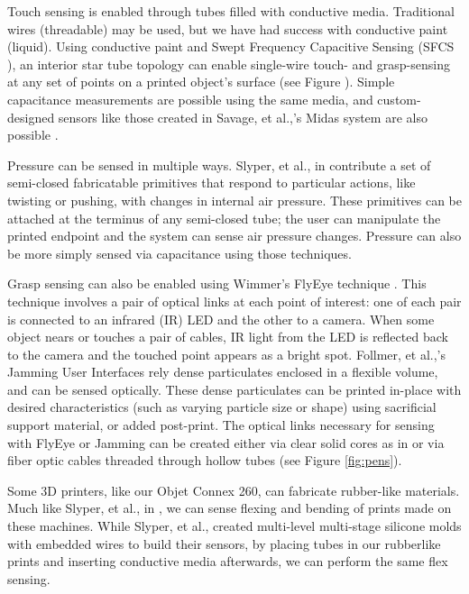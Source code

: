Touch sensing is enabled through tubes filled with conductive media.  Traditional wires (threadable) may be used, but we have had success with conductive paint (liquid).  Using conductive paint and Swept Frequency Capacitive Sensing (SFCS \cite{Sato-touche}), an interior star tube topology can enable single-wire touch- and grasp-sensing at any set of points on a printed object's surface (see Figure \cite{fig:toy}).  Simple capacitance measurements are possible using the same media, and custom-designed sensors like those created in Savage, et al.,'s Midas system are also possible \cite{Savage-midas}.

Pressure can be sensed in multiple ways.  Slyper, et al., in \cite{Slyper-pressure} contribute a set of semi-closed fabricatable primitives that respond to particular actions, like twisting or pushing, with changes in internal air pressure.    These primitives can be attached at the terminus of any semi-closed tube; the user can manipulate the printed endpoint and the system can sense air pressure changes.  Pressure can also be more simply sensed via capacitance using those techniques.

Grasp sensing can also be enabled using Wimmer's FlyEye technique \cite{Wimmer-flyeye}.  This technique involves a pair of optical links at each point of interest: one of each pair is connected to an infrared (IR) LED and the other to a camera.  When some object nears or touches a pair of cables, IR light from the LED is reflected back to the camera and the touched point appears as a bright spot.  Follmer, et al.,'s Jamming User Interfaces \cite{Follmer-jamming} rely dense particulates enclosed in a flexible volume, and can be sensed optically.  These dense particulates can be printed in-place with desired characteristics (such as varying particle size or shape) using sacrificial support material, or added post-print.  The optical links necessary for sensing with FlyEye or Jamming can be created either via clear solid cores as in \cite{Willis-printedoptics} or via fiber optic cables threaded through hollow tubes (see Figure \ref{fig:pens}).

Some 3D printers, like our Objet Connex 260, can fabricate rubber-like materials.  Much like Slyper, et al., in \cite{Slyper-shape}, we can sense flexing and bending of prints made on these machines.  While Slyper, et al., created multi-level multi-stage silicone molds with embedded wires to build their sensors, by placing tubes in our rubberlike prints and inserting conductive media afterwards, we can perform the same flex sensing.

